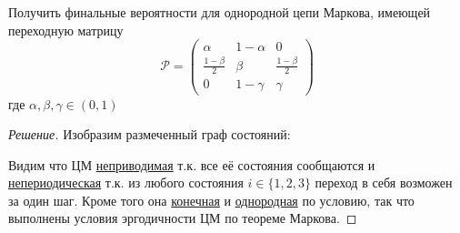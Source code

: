 \documentclass[12pt,a4paper]{article}
\author{Самутичев Е.Р.}
\date{\today}
\title{}
\newcommand{\incfig}[1]{%
	\def\svgwidth{\columnwidth}
	{#1.pdf_tex}
}
\begin{document}
	
\maketitle

\begin{exercise}[Задача 2]
	Получить финальные вероятности для однородной цепи Маркова, имеющей переходную матрицу
	$$\mathcal{P} = \begin{pmatrix}
	\alpha & 1 - \alpha & 0 \\
	\frac{1 - \beta}{2} & \beta & \frac{1 - \beta}{2} \\
	0 & 1 - \gamma & \gamma
	\end{pmatrix}$$
	где $\alpha, \beta, \gamma \in (0, 1)$
\end{exercise}
\begin{proof}[Решение]
	Изобразим размеченный граф состояний:
	\begin{figure}[h!]
		\scalebox{0.8}{\incfig{1}}
		\centering
	\end{figure}

	Видим что ЦМ \underline{неприводимая} т.к. все её состояния сообщаются и \underline{непериодическая} т.к. из любого состояния $i \in \{1, 2, 3\}$ переход в себя возможен за один шаг. Кроме того она \underline{конечная} и \underline{однородная} по условию, так что выполнены условия эргодичности ЦМ по теореме Маркова.
	

\end{proof}
\end{document}
